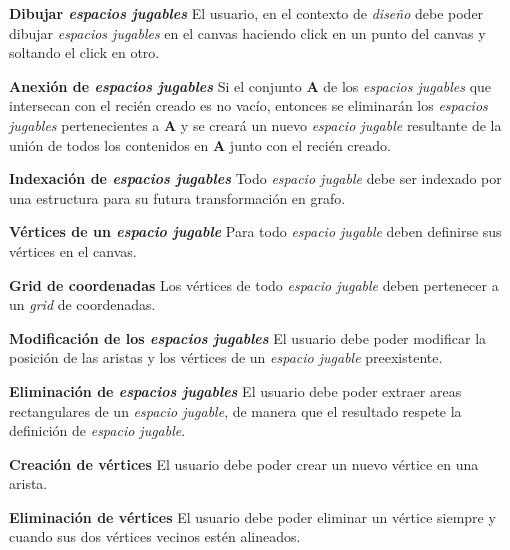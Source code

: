 \begin{functional}
	\item \textbf{Dibujar \textit{espacios jugables}}\newline
		El usuario, en el contexto de \textit{diseño} debe poder dibujar \textit{espacios jugables} en el canvas haciendo click en un punto del canvas y soltando el click en otro.
		\begin{functional}
			\item \textbf{Anexión de \textit{espacios jugables}}\newline
				Si el conjunto \textbf{A} de los \textit{espacios jugables} que intersecan con el recién creado es no vacío, entonces se eliminarán los \textit{espacios jugables} pertenecientes a \textbf{A} y se creará un nuevo \textit{espacio jugable} resultante de la unión de todos los contenidos en \textbf{A} junto con el recién creado.
			\item \textbf{Indexación de \textit{espacios jugables}}\newline
				Todo \textit{espacio jugable} debe ser indexado por una estructura para su futura transformación en grafo.
			\item \textbf{Vértices de un \textit{espacio jugable}}\newline
				Para todo \textit{espacio jugable} deben definirse sus vértices en el canvas.
			\item \textbf{Grid de coordenadas}
				Los vértices de todo \textit{espacio jugable} deben pertenecer a un \textit{grid} de coordenadas.
		\end{functional}
	\item \textbf{Modificación de los \textit{espacios jugables}}\newline
		El usuario debe poder modificar la posición de las aristas y los vértices de un \textit{espacio jugable} preexistente.
	\item \textbf{Eliminación de \textit{espacios jugables}}\newline
		El usuario debe poder extraer areas rectangulares de un \textit{espacio jugable}, de manera que el resultado respete la definición de \textit{espacio jugable}.
	\item \textbf{Creación de vértices}\newline
		El usuario debe poder crear un nuevo vértice en una arista.
	\item \textbf{Eliminación de vértices}\newline
		El usuario debe poder eliminar un vértice siempre y cuando sus dos vértices vecinos estén alineados.

\end{functional}
